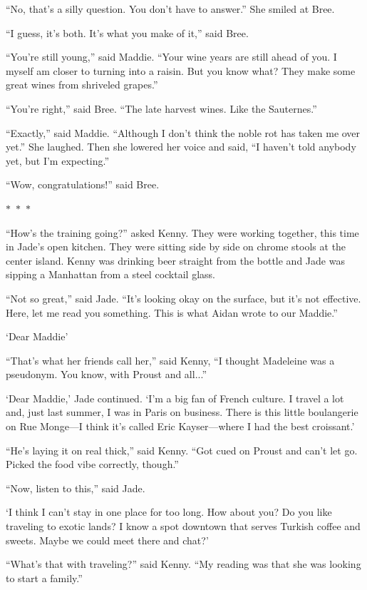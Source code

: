 \documentclass{memoir}
\newcommand{\starbreak}{%
\begin{center}
  $\ast$~$\ast$~$\ast$
\end{center}
}
\begin{document}
``No, that's a silly question. You don't have to answer.'' She smiled at Bree.

``I guess, it's both. It's what you make of it,'' said Bree.

``You're still young,'' said Maddie. ``Your wine years are still ahead of you. I myself am closer to turning into a raisin. But you know what? They make some great wines from shriveled grapes.''

``You're right,'' said Bree. ``The late harvest wines. Like the Sauternes.''

``Exactly,'' said Maddie. ``Although I don't think the noble rot has taken me over yet.'' She laughed. Then she lowered her voice and said, ``I haven't told anybody yet, but I'm expecting.''

``Wow, congratulations!'' said Bree.

\starbreak

``How's the training going?'' asked Kenny. They were working together, this time in Jade's open kitchen. They were sitting side by side on chrome stools at the center island. Kenny was drinking beer straight from the bottle and Jade was sipping a Manhattan from a steel cocktail glass.
 
``Not so great,'' said Jade. ``It's looking okay on the surface, but it's not effective. Here, let me read you something. This is what Aidan wrote to our Maddie.''

`Dear Maddie'

``That's what her friends call her,'' said Kenny, ``I thought Madeleine was a pseudonym. You know, with Proust and all...''

`Dear Maddie,' Jade continued. `I'm a big fan of French culture. I travel a lot and, just last summer, I was in Paris on business. There is this little boulangerie on Rue Monge---I think it's called Eric Kayser---where I had the best croissant.'

``He's laying it on real thick,'' said Kenny. ``Got cued on Proust and can't let go. Picked the food vibe correctly, though.''

``Now, listen to this,'' said Jade.

`I think I can't stay in one place for too long. How about you? Do you like traveling to exotic lands? I know a spot downtown that serves Turkish coffee and sweets. Maybe we could meet there and chat?'

``What's that with traveling?'' said Kenny. ``My reading was that she was looking to start a family.''
\end{document}
